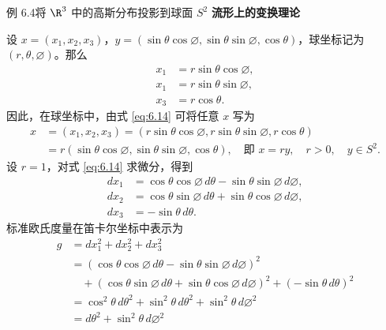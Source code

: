 \begin{statement}{例 6.4}{将 $\R^3$ 中的高斯分布投影到球面 $S^2$}
\medskip
\textbf{流形上的变换理论}\par
设 $x=(x_1,x_2,x_3)$，$y=(\sin\theta\cos\varnothing,\sin\theta\sin\varnothing,\cos\theta)$，球坐标记为 $(r,\theta,\varnothing)$。那么
\begin{equation*}
  \begin{aligned}
  x_1&=r\sin\theta\cos\varnothing,\\
  x_1&=r\sin\theta\sin\varnothing,\\
  x_3&=r\cos\theta.
  \end{aligned}
  \tag{6.14}\label{eq:6.14}
\end{equation*}
因此，在球坐标中，由式 \eqref{eq:6.14} 可将任意 $x$ 写为
\begin{equation*}
  \begin{aligned}
    x&=(x_1,x_2,x_3)
      =(r\sin\theta\cos\varnothing,r\sin\theta\sin\varnothing,r\cos\theta)\\
     &=r(\sin\theta\cos\varnothing,\sin\theta\sin\varnothing,\cos\theta),
       \quad\text{即 } x=ry,\quad r>0,\quad y\in S^2.
  \end{aligned}
  \tag{6.15}\label{eq:6.15}
\end{equation*}
设 $r=1$，对式 \eqref{eq:6.14} 求微分，得到
\begin{equation*}
  \begin{aligned}
    dx_1&=\cos\theta\cos\varnothing\,d\theta-\sin\theta\sin\varnothing\,d\varnothing,\\
    dx_2&=\cos\theta\sin\varnothing\,d\theta+\sin\theta\cos\varnothing\,d\varnothing,\\
    dx_3&=-\sin\theta\,d\theta.
  \end{aligned}
  \tag{6.16}\label{eq:6.16}
\end{equation*}
标准欧氏度量在笛卡尔坐标中表示为
\begin{equation*}
  \begin{aligned}
    g&=dx_1^2+dx_2^2+dx_3^2\\
     &=(\cos\theta\cos\varnothing\,d\theta-\sin\theta\sin\varnothing\,d\varnothing)^2\\
     &\quad+(\cos\theta\sin\varnothing\,d\theta+\sin\theta\cos\varnothing\,d\varnothing)^2
            +(-\sin\theta\,d\theta)^2\\
     &=\cos^2\theta\,d\theta^2+\sin^2\theta\,d\theta^2+\sin^2\theta\,d\varnothing^2\\
     &=d\theta^2+\sin^2\theta\,d\varnothing^2\\

\end{aligned}
\end{equation*}
\end{statement}
